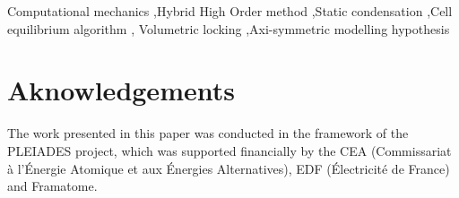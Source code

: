 \documentclass[3p,times,fleqn]{elsarticle}
\begin{document}
\begin{frontmatter}
\begin{keyword}


Computational mechanics \sep Hybrid High Order
method \sep Static condensation \sep Cell equilibrium algorithm \sep
Volumetric locking \sep Axi-symmetric modelling hypothesis
\end{keyword}

\end{frontmatter}



\tableofcontents









\section*{Aknowledgements}

The work presented in this paper was conducted in the framework of
the PLEIADES project, which was supported financially by the CEA
(Commissariat à l’Énergie Atomique et aux Énergies Alternatives), EDF
(Électricité de France) and Framatome.

\appendix
\label{sec_appendix}





% 
% 
% 
% 
% 
% 
\end{document}
